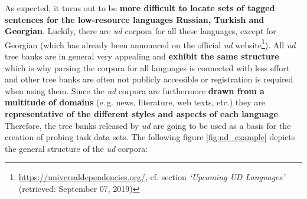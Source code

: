  As expected, it turns out to be \textbf{more difficult to locate sets of tagged sentences for the low-resource languages Russian, Turkish and Georgian}. Luckily, there are \textit{\gls{ud}} corpora for all these languages, except for Georgian (which has already been announced on the official \textit{\gls{ud}} website\footnote{\url{https://universaldependencies.org/}, cf. section \textit{`Upcoming UD Languages'} (retrieved: September 07, 2019)}). All \textit{\gls{ud}} tree banks are in general very appealing and \textbf{exhibit the same structure} which is why parsing the corpora for all languages is connected with less effort and other tree banks are often not publicly accessible or registration is required when using them. Since the \textit{\gls{ud}} corpora are furthermore \textbf{drawn from a multitude of domains} (e.\,g. news, literature, web texts, etc.) they are \textbf{representative of the different styles and aspects of each language}. Therefore, the tree banks released by \textit{\gls{ud}} are going to be used as a basis for the creation of probing task data sets. The following figure \vref{fig:ud_example} depicts the general structure of the \textit{\gls{ud}} corpora:

